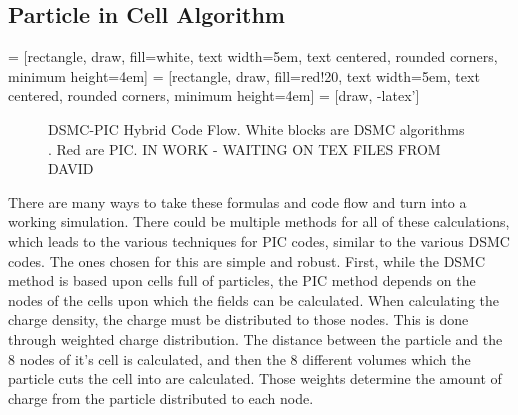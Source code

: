 \subsection{Particle in Cell Algorithm}
\label{sec:algorithm}

 = [rectangle, draw, fill=white, 
    text width=5em, text centered, rounded corners, minimum height=4em]
 = [rectangle, draw, fill=red!20, 
    text width=5em, text centered, rounded corners, minimum height=4em]
 = [draw, -latex']

\begin{figure}
\centering
    \label{fig:pic_flow}
    \caption{DSMC-PIC Hybrid Code Flow. White blocks are DSMC algorithms \cite{Galvez2018a}. Red are PIC. IN WORK - WAITING ON TEX FILES FROM DAVID}
\end{figure}

There are many ways to take these formulas and code flow and turn into a working simulation.  There could be multiple methods for all of these calculations, which leads to the various techniques for PIC codes, similar to the various DSMC codes. The ones chosen for this are simple and robust. First, while the DSMC method is based upon cells full of particles, the PIC method depends on the nodes of the cells upon which the fields can be calculated. When calculating the charge density, the charge must be distributed to those nodes. This is done through weighted charge distribution. The distance between the particle and the 8 nodes of it's cell is calculated, and then the 8 different volumes which the particle cuts the cell into are calculated. Those weights determine the amount of charge from the particle distributed to each node. \par

